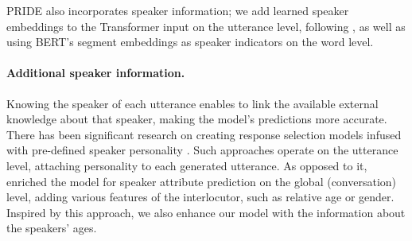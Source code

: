 PRIDE also incorporates speaker information; we add learned speaker embeddings to the Transformer input on the utterance level, following \citet{li2020hierarchical}, as well as using BERT's segment embeddings as speaker indicators on the word level.

\paragraph{Additional speaker information.} Knowing the speaker of each utterance enables to link the available external knowledge about that speaker, making the model's predictions more accurate. There has been significant research on creating response selection models infused with pre-defined speaker personality \cite{mazare2018training, zhang2018personalizing}. Such approaches operate on the utterance level, attaching personality to each generated utterance. As opposed to it, \citet{welch2019look} enriched the model for speaker attribute prediction on the global (conversation) level, adding various features of the interlocutor, such as relative age or gender. Inspired by this approach, we also enhance our model with the information about the speakers' ages.



